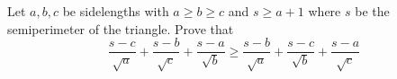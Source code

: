 Let $a,b,c$ be sidelengths with $a\ge b\ge c$ and $s\ge a+1$ where $s$ be the semiperimeter of the triangle. Prove that $$ \frac{s-c}{\sqrt{a}}+\frac{s-b}{\sqrt{c}}+\frac{s-a}{\sqrt{b}}\ge \frac{s-b}{\sqrt{a}}+\frac{s-c}{\sqrt{b}}+\frac{s-a}{\sqrt{c}}$$